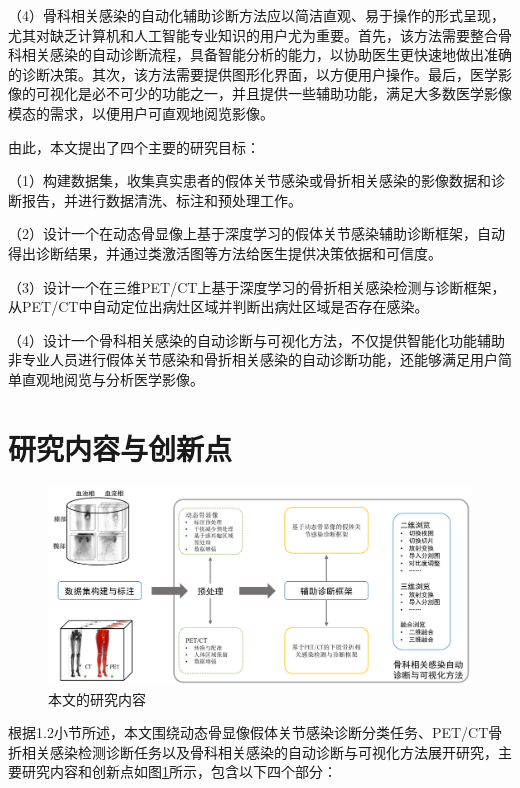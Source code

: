 （4）骨科相关感染的自动化辅助诊断方法应以简洁直观、易于操作的形式呈现，尤其对缺乏计算机和人工智能专业知识的用户尤为重要。首先，该方法需要整合骨科相关感染的自动诊断流程，具备智能分析的能力，以协助医生更快速地做出准确的诊断决策。其次，该方法需要提供图形化界面，以方便用户操作。最后，医学影像的可视化是必不可少的功能之一，并且提供一些辅助功能，满足大多数医学影像模态的需求，以便用户可直观地阅览影像。

由此，本文提出了四个主要的研究目标：

（1）构建数据集，收集真实患者的假体关节感染或骨折相关感染的影像数据和诊断报告，并进行数据清洗、标注和预处理工作。

（2）设计一个在动态骨显像上基于深度学习的假体关节感染辅助诊断框架，自动得出诊断结果，并通过类激活图等方法给医生提供决策依据和可信度。

（3）设计一个在三维PET/CT上基于深度学习的骨折相关感染检测与诊断框架，从PET/CT中自动定位出病灶区域并判断出病灶区域是否存在感染。

（4）设计一个骨科相关感染的自动诊断与可视化方法，不仅提供智能化功能辅助非专业人员进行假体关节感染和骨折相关感染的自动诊断功能，还能够满足用户简单直观地阅览与分析医学影像。

\section{研究内容与创新点}

\begin{figure}[htbp]
  \centering
  \includegraphics[width=\textwidth]{figures/chap01_research.png}
  \caption{本文的研究内容}
  \label{fig:chap01_research}
\end{figure}

根据1.2小节所述，本文围绕动态骨显像假体关节感染诊断分类任务、PET/CT骨折相关感染检测诊断任务以及骨科相关感染的自动诊断与可视化方法展开研究，主要研究内容和创新点如图\ref{fig:chap01_research}所示，包含以下四个部分：


